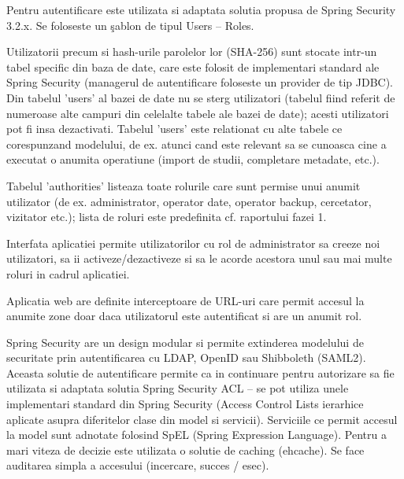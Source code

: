 
\medskip

Pentru autentificare este utilizata si adaptata solutia propusa de Spring Security 3.2.x.
Se foloseste un \c{s}ablon de tipul Users -- Roles.

\medskip

Utilizatorii precum si hash-urile parolelor lor (SHA-256) sunt stocate intr-un tabel specific din baza de date, care este folosit de implementari standard ale Spring Security (managerul de autentificare foloseste un provider de tip JDBC). 
Din tabelul 'users' al bazei de date nu se sterg utilizatori (tabelul fiind referit de numeroase alte campuri din celelalte tabele ale bazei de date); acesti utilizatori pot fi insa dezactivati.
Tabelul 'users' este relationat cu alte tabele ce corespunzand modelului, de ex. atunci cand este relevant sa se cunoasca cine a executat o anumita operatiune (import de studii, completare metadate, etc.).

Tabelul 'authorities' listeaza toate rolurile care sunt permise unui anumit utilizator (de ex. administrator, operator date, operator backup, cercetator, vizitator etc.); lista de roluri este predefinita cf. raportului fazei 1.

\medskip

Interfata aplicatiei permite utilizatorilor cu rol de administrator sa creeze noi utilizatori, sa ii activeze/dezactiveze si sa le acorde acestora unul sau mai multe roluri in cadrul aplicatiei.

Aplicatia web are definite interceptoare de URL-uri care permit accesul la anumite zone doar daca utilizatorul este autentificat si are un anumit rol.

\medskip

Spring Security are un design modular si permite extinderea modelului de securitate prin autentificarea cu LDAP, OpenID sau Shibboleth (SAML2).
Aceasta solutie de autentificare permite ca in continuare pentru autorizare sa fie utilizata si adaptata solutia Spring Security ACL --
se pot utiliza unele implementari standard din Spring Security (Access Control Lists ierarhice aplicate asupra diferitelor clase din model si servicii). 
Serviciile ce permit accesul la model sunt adnotate folosind SpEL
(Spring Expression Language).
Pentru a mari viteza de decizie este utilizata o solutie de caching (ehcache). 
Se face auditarea simpla a accesului (incercare, succes / esec). 

\medskip



